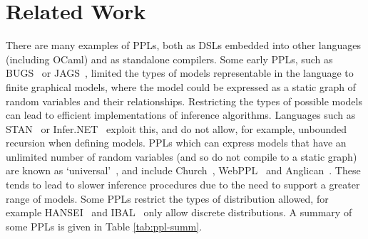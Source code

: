 \documentclass[sigconf]{acmart}
\begin{document}
\section{Related Work}
\label{s:related}

There are many examples of PPLs, both as DSLs embedded into other languages (including OCaml) and as standalone compilers. Some early PPLs, such as BUGS~\cite{gilks1994bugs} or JAGS~\cite{plummer2004jags}, limited the types of models representable in the language to finite graphical models, where the model could be expressed as a static graph of random variables and their relationships. Restricting the types of possible models can lead to efficient implementations of inference algorithms. Languages such as STAN~\cite{carpenter2017stan} or Infer.NET~\cite{wang2011using} exploit this, and do not allow, for example, unbounded recursion when defining models. PPLs which can express models that have an unlimited number of random variables (and so do not compile to a static graph) are known as `universal'~\cite{borgstrom2016lambda}, and include Church~\cite{goodman2012church}, WebPPL~\cite{mobus2018structure} and Anglican~\cite{anglican-smc}. These tends to lead to slower inference procedures due to the need to support a greater range of models. Some PPLs restrict the types of distribution allowed, for example HANSEI~\cite{kiselyov2009embedded} and IBAL~\cite{ibal} only allow discrete distributions. A summary of some PPLs is given in Table \ref{tab:ppl-summ}.
\end{document}
